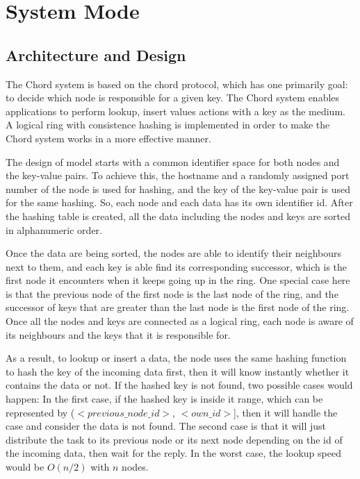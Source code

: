 \documentclass[a4paper]{article}
\begin{document}
\section{System Mode}

\subsection{Architecture and Design}

The Chord system is based on the chord protocol, which has one primarily goal: to decide which node is responsible for a given key. The Chord system enables applications to perform lookup, insert values actions with a key as the medium. A logical ring with consistence hashing is implemented in order to make the Chord system works in a more effective manner.

The design of model starts with a common identifier space for both nodes and the key-value pairs. To achieve this, the hostname and a randomly assigned port number of the node is used for hashing, and the key of the key-value pair is used for the same hashing. So, each node and each data has its own identifier id. After the hashing table is created, all the data including the nodes and keys are sorted in alphanumeric order. 

Once the data are being sorted, the nodes are able to identify their neighbours next to them, and each key is able find its corresponding successor, which is the first node it encounters when it keeps going up in the ring. One special case here is that the previous node of the first node is the last node of the ring, and the successor of keys that are greater than the last node is the first node of the ring. Once all the nodes and keys are connected as a logical ring, each node is aware of its neighbours and the keys that it is responsible for.

As a result, to lookup or insert a data, the node uses the same hashing function to hash the key of the incoming data first, then it will know instantly whether it contains the data or not. If the hashed key is not found, two possible cases would happen: In the first case, if the hashed key is inside it range, which can be represented by ($<previous\_node\_id>$, $<own\_id>$], then it will handle the case and consider the data is not found. The second case is that it will just distribute the task to its previous node or its next node depending on the id of the incoming data, then wait for the reply. In the worst case, the lookup speed would be $O(n/2)$ with $n$ nodes.
\end{document}
